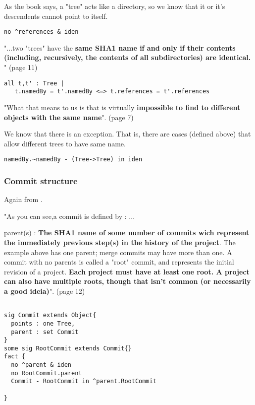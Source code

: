 As the book \cite{gitComm} says, a "tree" acts
like a directory, so we know that it or it's 
descendents cannot point to itself.
\begin{lstlisting}
no ^references & iden 
\end{lstlisting}

"...two "trees" have the { \bf same SHA1 name if and only if their
contents (including, recursively, the contents of all subdirectories)
are identical.} " (page 11)

\begin{lstlisting}
all t,t' : Tree | 
   t.namedBy = t'.namedBy <=> t.references = t'.references
\end{lstlisting}

"What that means to us is that is virtually {\bf impossible to find to 
different objects with the same name}". (page 7) \par
We know that there is an exception. That is,
there are cases (defined above)
that allow different trees to have same name. 

\begin{lstlisting}
namedBy.~namedBy - (Tree->Tree) in iden
\end{lstlisting}


\subsubsection{Commit structure}

Again from \cite{gitComm}. \par 
"As you can see,a commit is defined by :
... \par
parent(s) : {\bf The SHA1 name of some number of commits wich
represent the immediately previous step(s) in the 
history of the project}. The example above has one parent;
merge commits may have more than one. A commit with no 
parents is called a "root" commit, and represents the 
initial revision of a project. {\bf Each project must have at
least one root. A project can also have multiple roots,
though that isn't common (or necessarily a good ideia)}". (page 12)

\begin{lstlisting}

sig Commit extends Object{
  points : one Tree,
  parent : set Commit
}
some sig RootCommit extends Commit{}
fact {
  no ^parent & iden
  no RootCommit.parent
  Commit - RootCommit in ^parent.RootCommit

}

\end{lstlisting}

